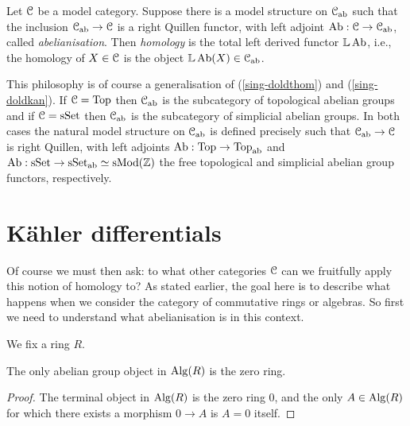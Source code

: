 \renewcommand{\L}{\mathbb{L}}

\begin{definition}
  \label{derivedab}
  Let $\mathcal{C}$ be a model category. Suppose there is a model structure on
  $\mathcal{C}_{\mathrm{ab}}$ such that the inclusion $\mathcal{C}_{\mathrm{ab}} \to \mathcal{C}$ is a right
  Quillen functor, with left adjoint $\operatorname{Ab} : \mathcal{C} \to \mathcal{C}_{\mathrm{ab}}$, called
  \emph{abelianisation}. Then \emph{homology} is the total left
  derived functor $\L \Ab$, i.e., the homology of $X \in \mathcal{C}$ is the
  object $\L \Ab(X) \in \C_\ab$.
\end{definition}

\begin{examples}
  This philosophy is of course a generalisation of
  (\ref{sing-doldthom}) and (\ref{sing-doldkan}). If $\mathcal{C} = \mathrm{Top}$ then
  $\mathcal{C}_{\mathrm{ab}}$ is the subcategory of topological abelian groups and if $\mathcal{C}
  = \mathrm{s}\mathrm{Set}$ then $\mathcal{C}_{\mathrm{ab}}$ is the subcategory of simplicial abelian
  groups. In both cases the natural model structure on $\mathcal{C}_{\mathrm{ab}}$ is
  defined precisely such that $\mathcal{C}_{\mathrm{ab}} \to \mathcal{C}$ is right Quillen, with
  left adjoints $\operatorname{Ab} : \mathrm{Top} \to \mathrm{Top}_{\mathrm{ab}}$ and $\operatorname{Ab} : \mathrm{s}\mathrm{Set} \to
  \mathrm{s}\mathrm{Set}_{\mathrm{ab}} \simeq \mathrm{s}\mathrm{Mod}(\mathbb{Z})$ the free topological and simplicial
  abelian group functors, respectively.
\end{examples}

\section{K\"ahler differentials}
\label{abelianalgebra}

Of course we must then ask: to what other categories $\mathcal{C}$ can we
fruitfully apply this notion of homology to? As stated earlier, the
goal here is to describe what happens when we consider the category of
commutative rings or algebras. So first we need to understand what
abelianisation is in this context.

\begin{notation}
  We fix a ring $R$.
\end{notation}

\begin{proposition}
  The only abelian group object in $\mathrm{Alg}(R)$ is the zero ring.
\end{proposition}

\begin{proof}
  The terminal object in $\mathrm{Alg}(R)$ is the zero ring $0$, and the only
  $A \in \mathrm{Alg}(R)$ for which there exists a morphism $0 \to A$ is $A =
  0$ itself.
\end{proof}

